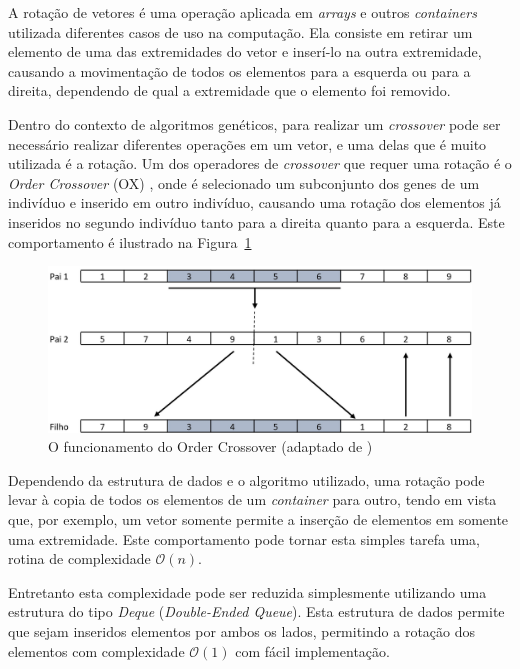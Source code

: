 \documentclass[12pt]{article}
\begin{document}
A rota\c{c}\~{a}o de vetores \'{e} uma opera\c{c}\~{a}o aplicada em \textit{arrays} e outros
\textit{containers} utilizada diferentes casos de uso na computa\c{c}\~{a}o.
Ela consiste em retirar um elemento de uma das extremidades do vetor e
inser\'{i}-lo na outra extremidade, causando a movimenta\c{c}\~{a}o de todos os elementos
para a esquerda ou para a direita, dependendo de qual a extremidade que o elemento
foi removido.

Dentro do contexto de algoritmos gen\'{e}ticos, para realizar um \textit{crossover} pode ser
necess\'{a}rio realizar diferentes opera\c{c}\~{o}es em um vetor, e uma delas que \'{e} muito
utilizada \'{e} a rota\c{c}\~{a}o. Um dos operadores de \textit{crossover} que requer uma
rota\c{c}\~{a}o \'{e} o \textit{Order Crossover} (OX) \cite{misc:geneticOperations}, onde \'{e} selecionado um subconjunto dos genes
de um indiv\'{i}duo e inserido em outro indiv\'{i}duo, causando uma rota\c{c}\~{a}o dos elementos j\'{a}
inseridos no segundo indiv\'{i}duo tanto para a direita quanto para a esquerda. Este comportamento \'{e}
ilustrado na Figura~\ref{fig:orderCrossover}

\begin{figure}[ht]
\centering
\includegraphics[width=.8\textwidth]{order_crossover.jpg}
\caption{O funcionamento do Order Crossover (adaptado de \cite{misc:geneticOperations})}
\label{fig:orderCrossover}
\end{figure}

Dependendo da estrutura de dados e o algoritmo utilizado, uma rota\c{c}\~{a}o pode levar \`{a}
copia de todos os elementos de um \textit{container} para outro, tendo em vista que, por exemplo,
um vetor somente permite a inser\c{c}\~{a}o de elementos em somente uma extremidade. Este
comportamento pode tornar esta simples tarefa uma, rotina de complexidade $\mathcal{O}(n)$.

Entretanto esta complexidade pode ser reduzida simplesmente utilizando uma estrutura do tipo
\textit{Deque} (\textit{Double-Ended Queue}). Esta estrutura de dados permite que sejam inseridos
elementos por ambos os lados, permitindo a rota\c{c}\~{a}o dos elementos com complexidade
$\mathcal{O}(1)$ com f\'{a}cil implementa\c{c}\~{a}o.
\end{document}
